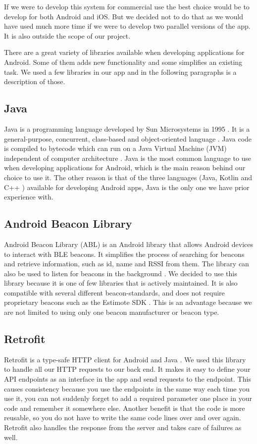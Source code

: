 \documentclass[../Main/thesis.tex]{subfiles}
\begin{document}
If we were to develop this system for commercial use the best choice would be to develop for both Android and iOS.
But we decided not to do that as we would have used much more time if we were to develop two parallel versions of the app.
It is also outside the scope of our project.

There are a great variety of libraries available when developing applications for Android.
Some of them adds new functionality and some simplifies an existing task.
We used a few libraries in our app and in the following paragraphs is a description of those. %

\subsection{Java}
Java is a programming language developed by Sun Microsystems in 1995 \citep{SunMicrosystems1996}. 
It is a general-purpose, concurrent, class-based and object-oriented language \citep[p. 1]{Gosling2018}.
Java code is compiled to bytecode which can run on a Java Virtual Machine (JVM) independent of computer architecture \citep{Venners2000}. 
Java is the most common language to use when developing applications for Android, which is the main reason behind our choice to use it.
The other reason is that of the three languages (Java, Kotlin and C++ \citep{Google2018b}) available for developing Android apps, Java is the only one we have prior experience with.


\subsection{Android Beacon Library}
Android Beacon Library (ABL) is an Android library that allows Android devices to interact with BLE beacons. 
It simplifies the process of searching for beacons and retrieve information, such as id, name and RSSI from them.
The library can also be used to listen for beacons in the background \citep{RadiusNetwork2015}.
We decided to use this library because it is one of few libraries that is actively maintained.
It is also compatible with several different beacon-standards, and does not require proprietary beacons such as the Estimote SDK \citep{Estimote2017}.
This is an advantage because we are not limited to using only one beacon manufacturer or beacon type.

\subsection{Retrofit}
Retrofit is a type-safe HTTP client for Android and Java \citep{SquareInc.2017}.
We used this library to handle all our HTTP requests to our back end. 
It makes it easy to define your API endpoints as an interface in the app and send requests to the endpoint.
This causes consistency because you use the endpoints in the same way each time you use it, you can not suddenly forget to add a required parameter one place in your code and remember it somewhere else.
Another benefit is that the code is more reusable, so you do not have to write the same code lines over and over again.
Retrofit also handles the response from the server and takes care of failures as well.
\end{document}
